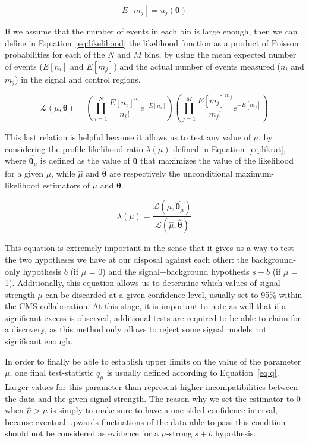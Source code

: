\documentclass[a4paper, 10pt, openright]{report}
\begin{document}
\begin{equation}
\label{eq:constraint}
E[m_j] = u_j(\bm \theta)
\end{equation}

If we assume that the number of events in each bin is large enough, then we can define in Equation~\ref{eq:likelihood} the likelihood function as a product of Poisson probabilities for each of the $N$ and $M$ bins, by using the mean expected number of events ($E[n_i]$ and $E[m_j]$) and the actual number of events measured ($n_i$ and $m_j$) in the signal and control regions.

\begin{equation}
\label{eq:likelihood}
\mathcal{L}(\mu, \bm \theta) = \left (\prod_{i = 1}^N \frac{E[n_i]^{n_i}}{n_i!} e^{-E[n_i]} \right) \left (\prod_{j=1}^M \frac{E[m_j]^{m_j}}{m_j!} e^{-E[m_j]} \right)
\end{equation}

This last relation is helpful because it allows us to test any value of $\mu$, by considering the profile likelihood ratio $\lambda(\mu)$ defined in Equation~\ref{eq:likrat}, where $\hat{\bm \theta_\mu}$ is defined as the value of $\bm \theta$ that maximizes the value of the likelihood for a given $\mu$, while $\hat{\mu}$ and $\hat{\bm \theta}$ are respectively the unconditional maximum-likelihood estimators of $\mu$ and $\bm \theta$.

\begin{equation}
\label{eq:likrat}
\lambda(\mu) = \frac{\mathcal{L}(\mu, \hat{\bm \theta_\mu})}{\mathcal{L}(\hat{\mu}, \hat{\bm \theta})} 
\end{equation}

This equation is extremely important in the sense that it gives us a way to test the two hypotheses we have at our disposal against each other: the background-only hypothesis $b$ (if $\mu$ = 0) and the signal+background hypothesis $s + b$ (if $\mu$ = 1). Additionally, this equation allows us to determine which values of signal strength $\mu$ can be discarded at a given confidence level, usually set to 95\% within the \ac{CMS} collaboration. At this stage, it is important to note as well that if a significant excess is observed, additional tests are required to be able to claim for a discovery, as this method only allows to reject some signal models not significant enough.

In order to finally be able to establish upper limits on the value of the parameter $\mu$, one final test-statistic $q_\mu$ is usually defined according to Equation~\ref{eq:q}. Larger values for this parameter than represent higher incompatibilities between the data and the given signal strength. The reason why we set the estimator to 0 when $\hat{\mu} > \mu$ is simply to make sure to have a one-sided confidence interval, because eventual upwards fluctuations of the data able to pass this condition should not be considered as evidence for a $\mu$-strong $s+b$ hypothesis.
\end{document}
